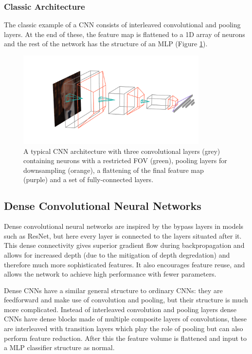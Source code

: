 \subsubsection{Classic Architecture}
The classic example of a CNN \cite{CS231n} consists of interleaved convolutional and pooling layers. At the end of these, the feature map is flattened to a 1D array of neurons and the rest of the network has the structure of an MLP (Figure \ref{fig:machine_learning:classic_CNN}). 
\begin{figure}[h!]
    \centering
    \includegraphics[width=0.85\textwidth]{figures/machine_learning/convnet_arch.pdf}
    \caption{A typical CNN architecture with three convolutional layers (grey) containing neurons with a restricted FOV (green), pooling layers for downsampling (orange), a flattening of the final feature map (purple) and a set of fully-connected layers.}
        \label{fig:machine_learning:classic_CNN}
\end{figure}


\subsection{Dense Convolutional Neural Networks}
Dense convolutional neural networks \cite{DenseNet} are inspired by the bypass layers in models such as  ResNet, but here every layer is connected to the layers situated after it. 
This dense connectivity gives superior gradient flow during backpropagation and allows for increased depth (due to the mitigation of depth degredation) and therefore much more sophisticated features. It also encourages feature reuse, and allows the network to achieve high performance with fewer parameters. 

Dense CNNs have a similar general structure to ordinary CNNs: they are feedforward and make use of convolution and pooling, but their structure is much more complicated. 
Instead of interleaved convolution and pooling layers dense CNNs have dense blocks made of multiple composite layers of convolutions, these are interleaved with transition layers which play the role of pooling but can also perform feature reduction. After this the feature volume is flattened and input to a MLP classifier structure as normal. 

